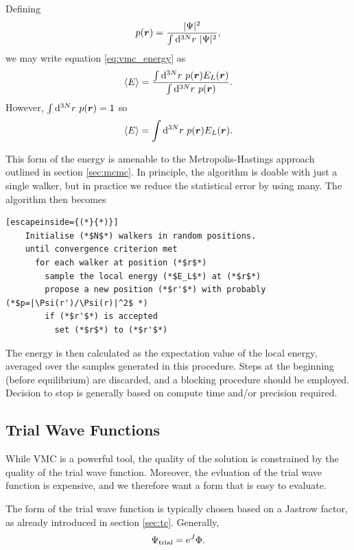 Defining
\begin{equation}
    p(\bm r) = \frac{|\Psi|^2}{\int\mathrm{d}^{3N}r\ |\Psi|^2},
\end{equation}
we may write equation \ref{eq:vmc_energy} as
\begin{equation}
    \langle E\rangle = \frac{\int\mathrm{d}^{3N}r\ p(\bm r)E_L(\bm r)}{\int\mathrm{d}^{3N}r\ p(\bm r)}.
\end{equation}
However, $\int\mathrm{d}^{3N}r\ p(\bm r) = 1$ so
\begin{equation}
    \langle E\rangle = \int\mathrm{d}^{3N}r\ p(\bm r)E_L(\bm r).
\end{equation}

This form of the energy is amenable to the Metropolis-Hastings approach outlined in section \ref{sec:mcmc}. In principle, the algorithm is doable with just a single walker, but in practice we reduce the statistical error by using many. The algorithm then becomes

\begin{minipage}{\textwidth}
\begin{lstlisting}[escapeinside={(*}{*)}]
    Initialise (*$N$*) walkers in random positions.
    until convergence criterion met
      for each walker at position (*$r$*)
        sample the local energy (*$E_L$*) at (*$r$*)
        propose a new position (*$r'$*) with probably (*$p=|\Psi(r')/\Psi(r)|^2$ *)
        if (*$r'$*) is accepted
          set (*$r$*) to (*$r'$*)
\end{lstlisting}
\end{minipage}

The energy is then calculated as the expectation value of the local energy, averaged over the samples generated in this procedure. Steps at the beginning (before equilibrium) are discarded, and a blocking procedure should be employed. Decision to stop is generally based on compute time and/or precision required.


\subsection{Trial Wave Functions}
\label{sec:jastrow}

While \gls{VMC} is a powerful tool, the quality of the solution is constrained by the quality of the trial wave function. Moreover, the evluation of the trial wave function is expensive, and we therefore want a form that is easy to evaluate.

The form of the trial wave function is typically chosen based on a Jastrow factor, as already introduced in section \ref{sec:tc}. Generally,
\begin{equation}
    \Psi_\mathrm{trial} = \mathrm{e}^J\Phi.
\end{equation}

